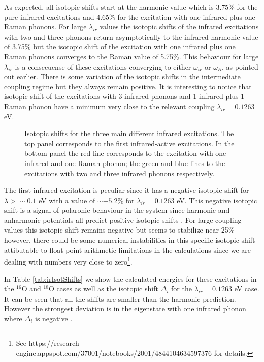 As expected, all isotopic shifts start at the harmonic value which is 3.75\% for the pure infrared excitations and 4.65\% for the excitation with one infrared plus one Raman phonons.
For large $\lambda_{ir}$ values the isotopic shifts of the infrared excitations with two and three phonons return asymptotically to the infrared harmonic value of 3.75\% but the isotopic shift of the excitation with one infrared plus one Raman phonons converges to the Raman value of 5.75\%.
This behaviour for large $\lambda_{ir}$ is a consecuense of these excitations converging to either $\omega_{ir}$ or $\omega_R$, as pointed out earlier.
There is some variation of the isotopic shifts in the intermediate coupling regime but they always remain positive.
It is interesting to notice that isotopic shift of the excitations with 3 infrared phonons and 1 infrared plus 1 Raman phonon have a minimum very close to the relevant coupling $\lambda_{ir}=0.1263$ eV.
%
\begin{figure}[ht]
  \centering
  
  \caption[Isotopic shifts for the different infrared excitations.]
  {Isotopic shifts for the three main different infrared excitations.
  The top panel corresponds to the first infrared-active excitations.
  In the bottom panel the red line corresponds to the excitation with one infrared and one Raman phonon; the green and blue lines to the excitations with two and three infrared phonons respectively.}
  \label{fig:irIsot}
\end{figure}

The first infrared excitation is peculiar since it has a negative isotopic shift for $\lambda > \sim 0.1$ eV with a value of $\sim -5.2$\% for $\lambda_{ir}=0.1263$ eV.
This negative isotopic shift is a signal of polaronic behaviour in the system since harmonic and anharmonic potentials all predict positive isotopic shifts \cite{MustredeLeon2000,Pali1998}.
For large coupling values this isotopic shift remains negative but seems to stabilize near 25\% however, there could be some numerical instabilities in this specific isotopic shift attibutable to float-point arithmetic limitations in the calculations since we are dealing with numbers very close to zero\footnote{See https://research-engine.appspot.com/37001/notebooks/2001/4844104634597376 for details.}.

In Table \ref{tab:irIsotShifts} we show the calculated energies for these excitations in the $^{16}$O and $^{18}$O cases as well as the isotopic shift $\Delta_i$ for the $\lambda_{ir}=0.1263$ eV case. It can be seen that all the shifts are smaller than the harmonic prediction. However the strongest deviation is in the eigenstate with one infrared phonon where $\Delta_i$ is negative \cite{GarciaSaraviaOrtizdeMontellano2014}.
 
